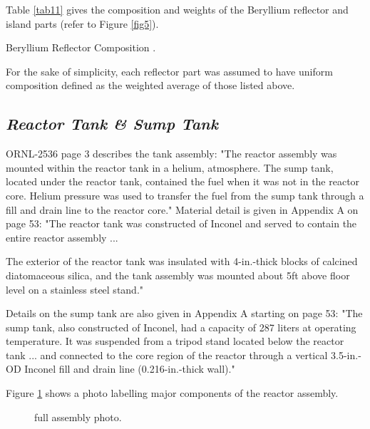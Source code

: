 \documentclass[ms,a4paper]{memoir}
\newcommand*{\msrarchive}{../../msr-archive}%
\begin{document}
Table \ref{tab11} gives the composition and weights of the Beryllium reflector and island parts (refer to Figure \ref{fig5}).

\begin{table}[H]
  \centering
  \caption{Beryllium Reflector Composition \parencite[Table 24]{ornl-2536}.}
  \label{tab11}
\end{table}

For the sake of simplicity, each reflector part was assumed to have uniform composition defined as the weighted average of those listed above.


\subsection{\emph{Reactor Tank \& Sump Tank}}

ORNL-2536 page 3 describes the tank assembly: "The reactor assembly was mounted within the reactor tank in a helium, atmosphere. The sump tank, located under the reactor tank, contained the fuel when it was not in the reactor core. Helium pressure was used to transfer the fuel from the sump tank through a fill and drain line to the reactor core." Material detail is given in Appendix A on page 53: "The reactor tank was constructed of Inconel and served to contain the entire reactor assembly ...

The exterior of the reactor tank was insulated with 4-in.-thick blocks of calcined diatomaceous silica, and the tank assembly was mounted about 5ft above floor level on a stainless steel stand."

Details on the sump tank are also given in Appendix A starting on page 53: "The sump tank, also constructed of Inconel, had a capacity of 287 liters at operating temperature. It was suspended from a tripod stand located below the reactor tank ... and connected to the core region of the reactor through a vertical 3.5-in.-OD Inconel fill and drain line (0.216-in.-thick wall)."

Figure \ref{fig4} shows a photo labelling major components of the reactor assembly.

\begin{figure}[H]
  \centering
  \caption{full assembly photo\parencite[Figure 6]{ornl-2536}.}
  \label{fig4}
\end{figure}
\end{document}

